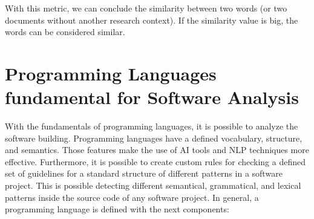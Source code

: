 With this metric, we can conclude the similarity between two words (or two documents without another research context). If the similarity value is big, the words can be considered similar.

\section{Programming Languages fundamental for Software Analysis}
With the fundamentals of programming languages, it is possible to analyze the software building. Programming languages have a defined vocabulary, structure, and semantics. Those features make the use of AI tools and NLP techniques more effective. Furthermore, it is possible to create custom rules for checking a defined set of guidelines for a standard structure of different patterns in a software project. This is possible detecting different semantical, grammatical, and lexical patterns inside the source code of any software project. In general, a programming language is defined with the next components:

